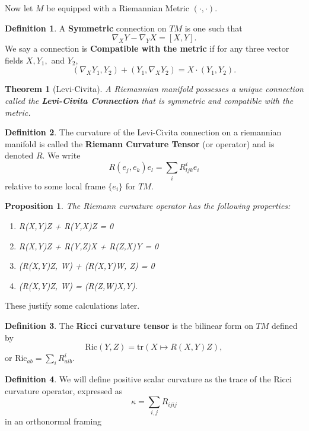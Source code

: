 \documentclass[11pt, reqno]{article}
\theoremstyle{plain}
\newtheorem*{theorem}{Theorem}
\newtheorem*{proposition}{Proposition}
\theoremstyle{definition}
\newtheorem*{definition}{Definition}
\theoremstyle{remark}
\begin{document}
Now let $M$ be equipped with a Riemannian Metric $(\cdot, \cdot)$. 

\begin{definition}
    A \textbf{Symmetric} connection on $TM$ is one such that
    \[
        \nabla_X Y - \nabla_Y X = [X, Y].
    \]
    We say a connection is \textbf{Compatible with the metric} if for any three vector 
    fields $X, Y_1,$ and $Y_2$, 
    \[
        (\nabla_X Y_1, Y_2) + (Y_1, \nabla_X Y_2) = X \cdot (Y_1, Y_2).
    \]
\end{definition}

\begin{theorem}[Levi-Civita]
    A Riemannian manifold possesses a unique connection called the \textbf{Levi-Civita Connection} 
    that is symmetric and compatible with the metric.
\end{theorem}


\begin{definition}
    The curvature of the Levi-Civita connection on a riemannian manifold is called the 
    \textbf{Riemann Curvature Tensor} (or operator) and is denoted $R$. We write 
    \[
        R(e_j, e_k)e_l = \sum_{i}R^i_{ljk}e_i
    \]
    relative to some local frame $\{e_i\}$ for $TM$.
\end{definition}

\begin{proposition}
    The Riemann curvature operator has the following properties:
    \begin{enumerate}
        \item[(i)] R(X,Y)Z + R(Y,X)Z = 0
        \item[(ii)] R(X,Y)Z + R(Y,Z)X + R(Z,X)Y = 0
        \item[(iii)] (R(X,Y)Z, W) + (R(X,Y)W, Z) = 0
        \item[(iv)] (R(X,Y)Z, W) = (R(Z,W)X,Y).
    \end{enumerate}
\end{proposition}

These justify some calculations later.

\begin{definition}
    The \textbf{Ricci curvature tensor} is the bilinear form on $TM$ defined by 
    \[
        \text{Ric}(Y,Z) = \text{tr}(X \mapsto R(X,Y)Z),
    \]
    or $\text{Ric}_{ab} = \sum_i R_{aib}^i$.
\end{definition}

\begin{definition}
    We will define positive scalar curvature as the trace of the Ricci curvature operator, expressed as
    \[
        \kappa = \sum_{i,j}R_{ijij}
    \]
    in an orthonormal framing
\end{definition}
\end{document}
